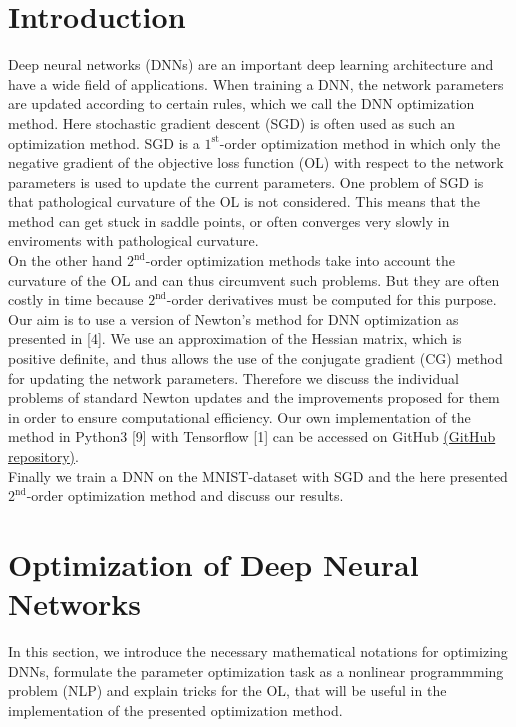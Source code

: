 \documentclass[conference]{IEEEtran}
\begin{document}
\section{Introduction} 
\noindent
Deep neural networks (DNNs) are an important deep learning architecture and have a wide field of applications. When training a DNN, the network parameters are updated according to certain rules, which we call the DNN optimization method. Here stochastic gradient descent (SGD) is often used as such an optimization method. SGD is a $1^{\text{st}}$-order optimization method in which only the negative gradient of the objective loss function (OL) with respect to the network parameters is used to update the current parameters. One problem of SGD is that pathological curvature of the OL is not considered. This means that the method can get stuck in saddle points, or often converges very slowly in enviroments with pathological curvature.\\
On the other hand $2^{\text{nd}}$-order optimization methods take into account the curvature of the OL and can thus circumvent such problems. But they are often costly in time because $2^{\text{nd}}$-order derivatives must be computed for this purpose.\\
Our aim is to use a version of Newton's method for DNN optimization as presented in [4]. We use an approximation of the Hessian matrix, which is positive definite, and thus allows the use of the conjugate gradient (CG) method for updating the network parameters. Therefore we discuss the individual problems of standard Newton updates and the improvements proposed for them in order to ensure computational efficiency. Our own implementation of the method in Python3 [9] with Tensorflow [1] can be accessed on GitHub \href{https://github.com/NiklasBrunn/Hessian_Free_Optimization_of_Deep_Neural_Networks}{(GitHub repository)}.\\ 
Finally we train a DNN on the MNIST-dataset with SGD and the here presented $2^{\text{nd}}$-order optimization method and discuss our results.


\section{Optimization of Deep Neural Networks}
\noindent
In this section, we introduce the necessary mathematical notations for optimizing DNNs, formulate the parameter optimization task as a nonlinear programmming problem (NLP) and explain tricks for the OL, that will be useful in the implementation of the presented optimization method.
\end{document}

